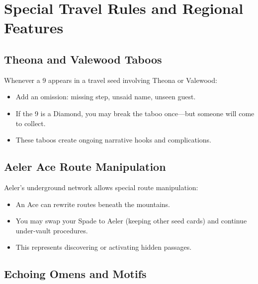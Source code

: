 \section{Special Travel Rules and Regional Features}\label{sec:special_rules}

\subsection{Theona and Valewood Taboos}\label{subsec:theona_taboos}

Whenever a 9 appears in a travel seed involving Theona or Valewood:
\begin{itemize}
    \item Add an omission: missing step, unsaid name, unseen guest.
    \item If the 9 is a Diamond, you may break the taboo once---but someone will come to collect.
    \item These taboos create ongoing narrative hooks and complications.
\end{itemize}

\subsection{Aeler Ace Route Manipulation}\label{subsec:aeler_aces}

Aeler's underground network allows special route manipulation:
\begin{itemize}
    \item An Ace can rewrite routes beneath the mountains.
    \item You may swap your Spade to Aeler (keeping other seed cards) and continue under‑vault procedures.
    \item This represents discovering or activating hidden passages.
\end{itemize}

\subsection{Echoing Omens and Motifs}\label{subsec:echoing_omens}

